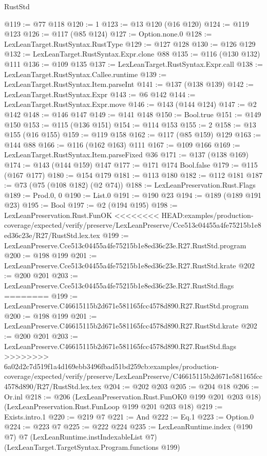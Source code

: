 \begin{lexlean}{RustStd}
\begin{coremodule}
{\begin{coremodule}
{{{{{@119 := @77 @118
@120 := 1
@123 := @13 @120 (@16 @120)
@124 := @119 @123
@126 := @117 (@85 @124)
@127 := Option.none.{0}
@128 := LexLeanTarget.RustSyntax.RustType
@129 := @127 @128
@130 := @126 @129
@132 := LexLeanTarget.RustSyntax.Expr.clone @88
@135 := @116 (@130 @132) @111
@136 := @109 @135
@137 := LexLeanTarget.RustSyntax.Expr.call
@138 := LexLeanTarget.RustSyntax.Callee.runtime
@139 := LexLeanTarget.RustSyntax.Item.parseInt
@141 := @137 (@138 @139)
@142 := LexLeanTarget.RustSyntax.Expr
@143 := @6 @142
@144 := LexLeanTarget.RustSyntax.Expr.move
@146 := @143 (@144 @124)
@147 := @2 @142
@148 := @146 @147
@149 := @141 @148
@150 := Bool.true
@151 := @149 @150
@153 := @115 (@136 @151)
@154 := @114 @153
@155 := 2
@158 := @13 @155 (@16 @155)
@159 := @119 @158
@162 := @117 (@85 @159) @129
@163 := @144 @88
@166 := @116 (@162 @163) @111
@167 := @109 @166
@169 := LexLeanTarget.RustSyntax.Item.parseFixed @36
@171 := @137 (@138 @169)
@174 := @143 (@144 @159) @147
@177 := @171 @174 Bool.false
@179 := @115 (@167 @177)
@180 := @154 @179
@181 := @113 @180
@182 := @112 @181
@187 := @73 (@75 (@108 @182) (@2 @74))
@188 := LexLeanPreservation.Rust.Flags
@189 := Prod.{0, 0}
@190 := List.{0}
@191 := @190 @23
@194 := @189 (@189 @191 @23)
@195 := Bool
@197 := @2 (@194 @195)
@198 := LexLeanPreservation.Rust.FunOK
<<<<<<<< HEAD:examples/production-coverage/expected/verify/preserve/LexLeanPreserve/Cce513c04455a4fe75215b1e8ed36c23e/R27/RustStd.lex.tex
@199 := LexLeanPreserve.Cce513c04455a4fe75215b1e8ed36c23e.R27.RustStd.program
@200 := @198 @199
@201 := LexLeanPreserve.Cce513c04455a4fe75215b1e8ed36c23e.R27.RustStd.krate
@202 := @200 @201
@203 := LexLeanPreserve.Cce513c04455a4fe75215b1e8ed36c23e.R27.RustStd.flags
========
@199 := LexLeanPreserve.C46615115b2d671e581165fcc4578d890.R27.RustStd.program
@200 := @198 @199
@201 := LexLeanPreserve.C46615115b2d671e581165fcc4578d890.R27.RustStd.krate
@202 := @200 @201
@203 := LexLeanPreserve.C46615115b2d671e581165fcc4578d890.R27.RustStd.flags
>>>>>>>> 6a02d2c7d519f1a4d169ebb3496fbad51bd259cb:examples/production-coverage/expected/verify/preserve/LexLeanPreserve/C46615115b2d671e581165fcc4578d890/R27/RustStd.lex.tex
@204 := @202 @203
@205 := @204 @18
@206 := Or.inl
@218 := @206
    (LexLeanPreservation.Rust.FunOK0 @199 @201 @203 @18)
    (LexLeanPreservation.Rust.FunLoop @199 @201 @203 @18)
@219 := Exists.intro.{1}
@220 := @219 @7
@221 := And
@222 := Eq.{1}
@223 := Option.{0}
@224 := @223 @7
@225 := @222 @224
@235 := LexLeanRuntime.index
    (@190 @7)
    @7
    (LexLeanRuntime.instIndexableList @7)
    (LexLeanTarget.TargetSyntax.Program.functions @199)
}}}}}
\end{coremodule}}
\end{coremodule}
\end{lexlean}

